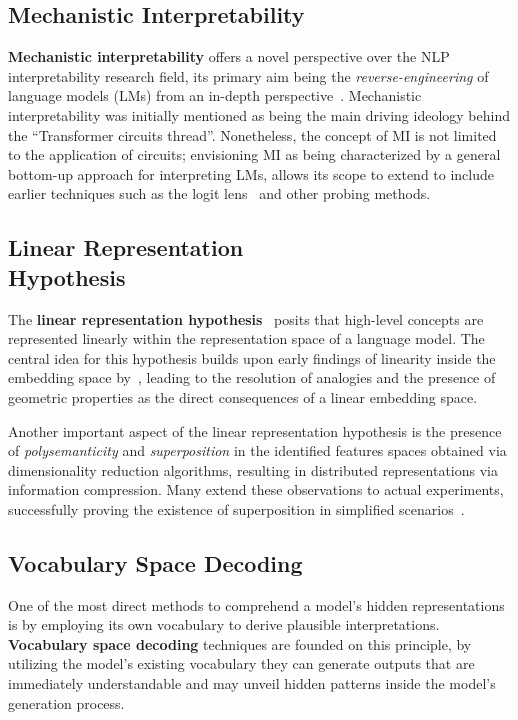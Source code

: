 \documentclass[11pt,a4paper,twocolumn]{article}
\begin{document}
\subsection{Mechanistic Interpretability}

\textbf{Mechanistic interpretability} offers a novel perspective over the NLP interpretability research field, its primary aim being the \emph{reverse-engineering} of language models (LMs) from an in-depth perspective~\cite{olah2022}.
Mechanistic interpretability was initially mentioned as being the main driving ideology behind the ``Transformer circuits thread''.
Nonetheless, the concept of MI is not limited to the application of circuits; envisioning MI as being characterized by a general bottom-up approach for interpreting LMs, allows its scope to extend to include earlier techniques such as the logit lens~\cite{nostalgebraist2020} and other probing methods.

\subsection{Linear Representation \texorpdfstring{ \\ }{} Hypothesis}

The \textbf{linear representation hypothesis}~\cite{park2023} posits that high-level concepts are represented linearly within the representation space of a language model.
The central idea for this hypothesis builds upon early findings of linearity inside the embedding space by~\citet{mikolov2013}, leading to the resolution of analogies and the presence of geometric properties as the direct consequences of a linear embedding space.

Another important aspect of the linear representation hypothesis is the presence of \emph{polysemanticity} and \emph{superposition} in the identified features spaces obtained via dimensionality reduction algorithms, resulting in distributed representations via information compression.
Many extend these observations to actual experiments, successfully proving the existence of superposition in simplified scenarios~\cite{elhage2022}.

\subsection{Vocabulary Space Decoding}

One of the most direct methods to comprehend a model's hidden representations is by employing its own vocabulary to derive plausible interpretations.
\textbf{Vocabulary space decoding} techniques are founded on this principle, by utilizing the model's existing vocabulary they can generate outputs that are immediately understandable and may unveil hidden patterns inside the model's generation process.
\end{document}
